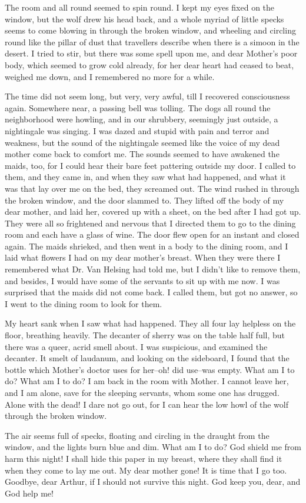 The room and all round seemed to spin round. I kept my eyes fixed on the window, but the wolf drew his head back, and a whole myriad of little specks seems to come blowing in through the broken window, and wheeling and circling round like the pillar of dust that travellers describe when there is a simoon in the desert. I tried to stir, but there was some spell upon me, and dear Mother's poor body, which seemed to grow cold already, for her dear heart had ceased to beat, weighed me down, and I remembered no more for a while. 

The time did not seem long, but very, very awful, till I recovered consciousness again. Somewhere near, a passing bell was tolling. The dogs all round the neighborhood were howling, and in our shrubbery, seemingly just outside, a nightingale was singing. I was dazed and stupid with pain and terror and weakness, but the sound of the nightingale seemed like the voice of my dead mother come back to comfort me. The sounds seemed to have awakened the maids, too, for I could hear their bare feet pattering outside my door. I called to them, and they came in, and when they saw what had happened, and what it was that lay over me on the bed, they screamed out. The wind rushed in through the broken window, and the door slammed to. They lifted off the body of my dear mother, and laid her, covered up with a sheet, on the bed after I had got up. They were all so frightened and nervous that I directed them to go to the dining room and each have a glass of wine. The door flew open for an instant and closed again. The maids shrieked, and then went in a body to the dining room, and I laid what flowers I had on my dear mother's breast. When they were there I remembered what Dr. Van Helsing had told me, but I didn't like to remove them, and besides, I would have some of the servants to sit up with me now. I was surprised that the maids did not come back. I called them, but got no answer, so I went to the dining room to look for them. 

My heart sank when I saw what had happened. They all four lay helpless on the floor, breathing heavily. The decanter of sherry was on the table half full, but there was a queer, acrid smell about. I was suspicious, and examined the decanter. It smelt of laudanum, and looking on the sideboard, I found that the bottle which Mother's doctor uses for her--oh! did use--was empty. What am I to do? What am I to do? I am back in the room with Mother. I cannot leave her, and I am alone, save for the sleeping servants, whom some one has drugged. Alone with the dead! I dare not go out, for I can hear the low howl of the wolf through the broken window. 

The air seems full of specks, floating and circling in the draught from the window, and the lights burn blue and dim. What am I to do? God shield me from harm this night! I shall hide this paper in my breast, where they shall find it when they come to lay me out. My dear mother gone! It is time that I go too. Goodbye, dear Arthur, if I should not survive this night. God keep you, dear, and God help me! 
